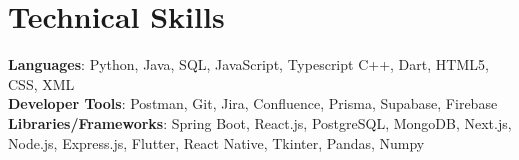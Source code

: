 \documentclass[letterpaper,11pt]{article}
\begin{document}
\section{Technical Skills}
 \begin{itemize}[leftmargin=0.15in, label={}]
    \small{\item{   
     \textbf{Languages}{: Python, Java, SQL, JavaScript, Typescript C++, Dart, HTML5, CSS, XML} \\[1mm]
     \textbf{Developer Tools}{: Postman, Git, Jira, Confluence, Prisma, Supabase, Firebase} \\[1mm]
     \textbf{Libraries/Frameworks}{: Spring Boot, React.js, PostgreSQL, MongoDB, Next.js, Node.js, Express.js, Flutter, React Native, Tkinter, Pandas, Numpy} \\ [1mm]
    }}
 \end{itemize}
 \vspace{-16pt}
 \vspace{3pt}
\vspace{10pt}

\vspace{-15pt}
\end{document}
